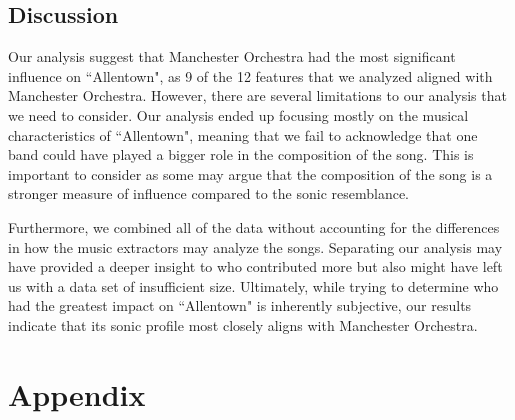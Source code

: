 \documentclass{article}\usepackage[]{graphicx}\usepackage[]{xcolor}
\begin{document}
\begin{multicols}{2}
\section{Discussion}
Our analysis suggest that Manchester Orchestra had the most significant influence on ``Allentown", as 9 of the 12 features that we analyzed aligned with Manchester Orchestra. However, there are several limitations to our analysis that we need to consider. Our analysis ended up focusing mostly on the musical characteristics of ``Allentown", meaning that we fail to acknowledge that one band could have played a bigger role in the composition of the song. This is important to consider as some may argue that the composition of the song is a stronger measure of influence compared to the sonic resemblance.

Furthermore, we combined all of the data without accounting for the differences in how the music extractors may analyze the songs. Separating our analysis may have provided a deeper insight to who contributed more but also might have left us with a data set of insufficient size. Ultimately, while trying to determine who had the greatest impact on ``Allentown" is inherently subjective, our results indicate that its sonic profile most closely aligns with Manchester Orchestra.  


\vspace{1em}


\begin{tiny}

\end{tiny}

\end{multicols}

\section{Appendix}
\end{document}
